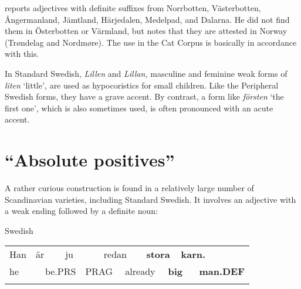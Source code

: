 \begin{styleBodytextC}
\citet[51]{Delsing2003a} reports adjectives with definite suffixes from Norrbotten, Västerbotten, Ångermanland, Jämtland, Härjedalen, Medelpad, and Dalarna. He did not find them in Österbotten or Värmland, but notes that they are attested in Norway (Trøndelag and Nordmøre). The use in the Cat Corpus is basically in accordance with this. 

\end{styleBodytextC}

\begin{styleBodytextC}
In Standard Swedish, \textit{Lillen} and \textit{Lillan,} masculine and feminine weak forms of \textit{liten} ‘little’, are used as hypocoristics for small children. Like the Peripheral Swedish forms, they have a grave accent. By contrast, a form like \textit{försten} ‘the first one’, which is also sometimes used, is often pronounced with an acute accent. 

\end{styleBodytextC}

\section{“Absolute positives”}
\label{bkm:Ref141250984}
\begin{styleBodyTextFirst}
A rather curious construction is found in a relatively large number of Scandinavian varieties, including Standard Swedish. It involves an adjective with a weak ending followed by a definite noun:

\end{styleBodyTextFirst}

\begin{listWWNumileveli}
\item 

\begin{styleExample}
Swedish

\end{styleExample}

\end{listWWNumileveli}

\begin{tabular}{llllllllllll}
\lsptoprule
Han & \multicolumn{2}{l}{är

} & \multicolumn{2}{l}{ju

} & \multicolumn{2}{l}{redan

} & \multicolumn{2}{l}{{\bfseries stora}

} & \multicolumn{2}{l}{{\bfseries karn.}

} & \\
\multicolumn{2}{l}{he

} & \multicolumn{2}{l}{be.PRS

} & \multicolumn{2}{l}{PRAG

} & \multicolumn{2}{l}{already

} & \multicolumn{2}{l}{{\bfseries big}

} & \multicolumn{2}{l}{{\bfseries man.DEF}

}\\
\lspbottomrule
\end{tabular}

